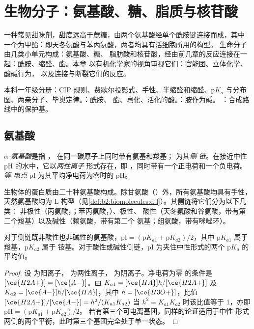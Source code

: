 \chapter{生物分子：氨基酸、糖、脂质与核苷酸}\label{ch:b2:biomolecules}

一种常见甜味剂，甜度远高于蔗糖，由两个氨基酸经单个酰胺键连接而成，其中
一个为甲酯：即天冬氨酸与苯丙氨酸，两者均具有活细胞所用的构型。
生命分子由几类小单元构成：氨基酸、糖、
脂肪酸和核苷酸，经由前几章的反应连接在一起：酰胺、缩醛、酯。本章
以有机化学家的视角审视它们：官能团、立体化学、酸碱行为，
以及连接与断裂它们的反应。

\begin{recall}
本科一年级分册：CIP 规则、费歇尔投影式、手性、半缩醛和缩醛、$\mathrm pK_a$
与分布图、两亲分子、毕奥定律。：酰胺、
酯、皂化、活化的酸。：胺作为碱。
：合成路线中的保护基。
\end{recall}

\section{氨基酸}

\begin{definition}[氨基酸]\label{def:b2:biomolecules:amino-acid}
\emph{$\alpha$-氨基酸}是指 ，
在同一碳原子上同时带有氨基和羧基； 为其\emph{侧
链}。在接近中性 pH 的水中，它以\emph{两性离子}
形式存在，即 ，同时带有一个正电荷和一个负电荷。\emph{等
电点} pI 为其平均净电荷为零时的 pH。
\end{definition}

生物体的蛋白质由二十种氨基酸构成。除甘氨酸（）外，所有氨基酸均具有手性，
天然氨基酸均为 L 构型（见\cref{def:b2:biomolecules:d-l}）。其侧链将它们分为以下几类：
非极性（丙氨酸，；苯丙氨酸，）、极性、
酸性（天冬氨酸和谷氨酸，带有第二个羧基）以及碱性（赖氨酸，带有第二个
氨基；组氨酸，带有咪唑环）。

\begin{proposition}[等电点]\label{prop:b2:biomolecules:pi}
对于侧链既非酸性也非碱性的氨基酸，$\mathrm{pI} = (\mathrm pK_{a1} +
\mathrm pK_{a2})/2$，其中 $\mathrm pK_{a1}$ 属于羧基，$\mathrm pK_{a2}$ 属于
铵基。对于酸性或碱性侧链，pI 为夹住中性形式的两个 $\mathrm pK_a$ 的
平均值。
\end{proposition}

\begin{proof}
设  为阳离子， 为两性离子， 为阴离子。净电荷为零
的条件是 $[\ce{H2A+}] = [\ce{A-}]$。由 $K_{a1} = [\ce{HA}]h/[\ce{H2A+}]$ 及 $K_{a2} =
[\ce{A-}]h/[\ce{HA}]$，其中 $h = [\ce{H3O+}]$，比值 $[\ce{H2A+}]/[\ce{A-}] = h^2/(K_{a1}K_{a2})$
当 $h^2 = K_{a1}K_{a2}$ 时该比值等于 1，亦即 $\mathrm{pH} = (\mathrm pK_{a1} + \mathrm pK_{a2})/2$。
若有第三个可电离基团，同样的论证适用于中性
形式两侧的两个平衡，此时第三个基团完全处于单一状态。
\end{proof}

